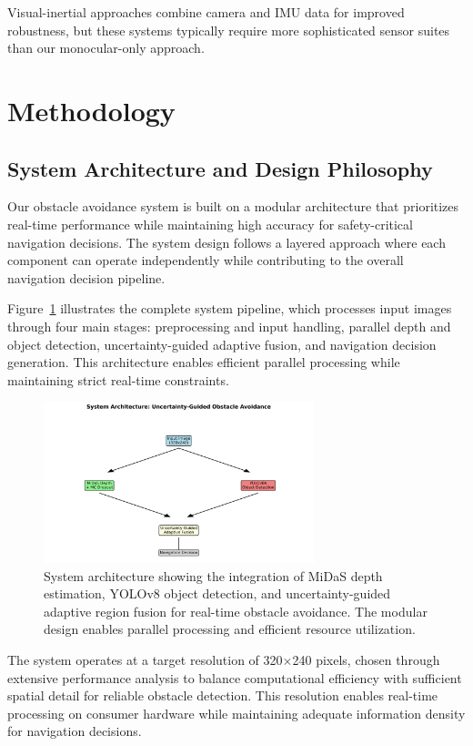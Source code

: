 \documentclass[10pt]{article}
\newcommand{\figref}[1]{Figure~\ref{#1}}
\begin{document}
Visual-inertial approaches \cite{qin2018vins} combine camera and IMU data for improved robustness, but these systems typically require more sophisticated sensor suites than our monocular-only approach.

\section{Methodology}

\subsection{System Architecture and Design Philosophy}

Our obstacle avoidance system is built on a modular architecture that prioritizes real-time performance while maintaining high accuracy for safety-critical navigation decisions. The system design follows a layered approach where each component can operate independently while contributing to the overall navigation decision pipeline.

\figref{fig:architecture} illustrates the complete system pipeline, which processes input images through four main stages: preprocessing and input handling, parallel depth and object detection, uncertainty-guided adaptive fusion, and navigation decision generation. This architecture enables efficient parallel processing while maintaining strict real-time constraints.

\begin{figure}[ht]
\centering
\includegraphics[width=0.7\textwidth]{system_architecture.png}
\caption{System architecture showing the integration of MiDaS depth estimation, YOLOv8 object detection, and uncertainty-guided adaptive region fusion for real-time obstacle avoidance. The modular design enables parallel processing and efficient resource utilization.}
\label{fig:architecture}
\end{figure}

The system operates at a target resolution of 320$\times$240 pixels, chosen through extensive performance analysis to balance computational efficiency with sufficient spatial detail for reliable obstacle detection. This resolution enables real-time processing on consumer hardware while maintaining adequate information density for navigation decisions.
\end{document}
